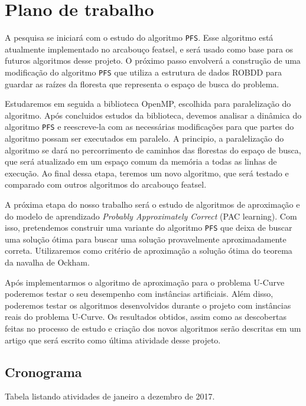 \documentclass[12pt]{article}
\begin{document}
\section{Plano de trabalho}
A pesquisa se iniciará com o estudo do algoritmo {\tt PFS}. Esse 
algoritmo está atualmente implementado no arcabouço featsel, e será 
usado como base para os futuros algoritmos desse projeto. O próximo 
passo envolverá a construção de uma modificação do algoritmo {\tt PFS}
que utiliza a estrutura de dados ROBDD para guardar as raízes da 
floresta que representa o espaço de busca do problema.

Estudaremos em seguida a biblioteca OpenMP, escolhida para paralelização
do algoritmo. Após concluidos estudos da biblioteca, devemos analisar a
dinâmica do algoritmo {\tt PFS} e reescreve-la com as necessárias 
modificações para que partes do algoritmo possam ser executados em
paralelo. A principio, a paralelização do algoritmo se dará no 
percorrimento de caminhos das florestas do espaço de busca, que será 
atualizado em um espaço comum da memória a todas as linhas de execução.
Ao final dessa etapa, teremos um novo algoritmo, que será testado
e comparado com outros algoritmos do arcabouço featsel.

A próxima etapa do nosso trabalho será o estudo de algoritmos de 
aproximação e do modelo de aprendizado \textit{Probably Approximately
Correct} (PAC learning). Com isso, pretendemos construir uma variante do
algoritmo {\tt PFS} que deixa de buscar uma solução ótima para buscar
uma solução provavelmente aproximadamente correta. Utilizaremos como 
critério de aproximação a solução ótima do teorema da navalha de Ockham.

Após implementarmos o algoritmo de aproximação para o problema U-Curve
poderemos testar o seu desempenho com instâncias artificiais. Além 
disso, poderemos testar os algoritmos desenvolvidos durante o projeto
com instâncias reais do problema U-Curve. Os resultados obtidos, assim
como as descobertas feitas no processo de estudo e criação dos novos
algoritmos serão descritas em um artigo que será escrito como última 
atividade desse projeto.

\subsection{Cronograma}
Tabela listando atividades de janeiro a dezembro de 2017.
\end{document}
